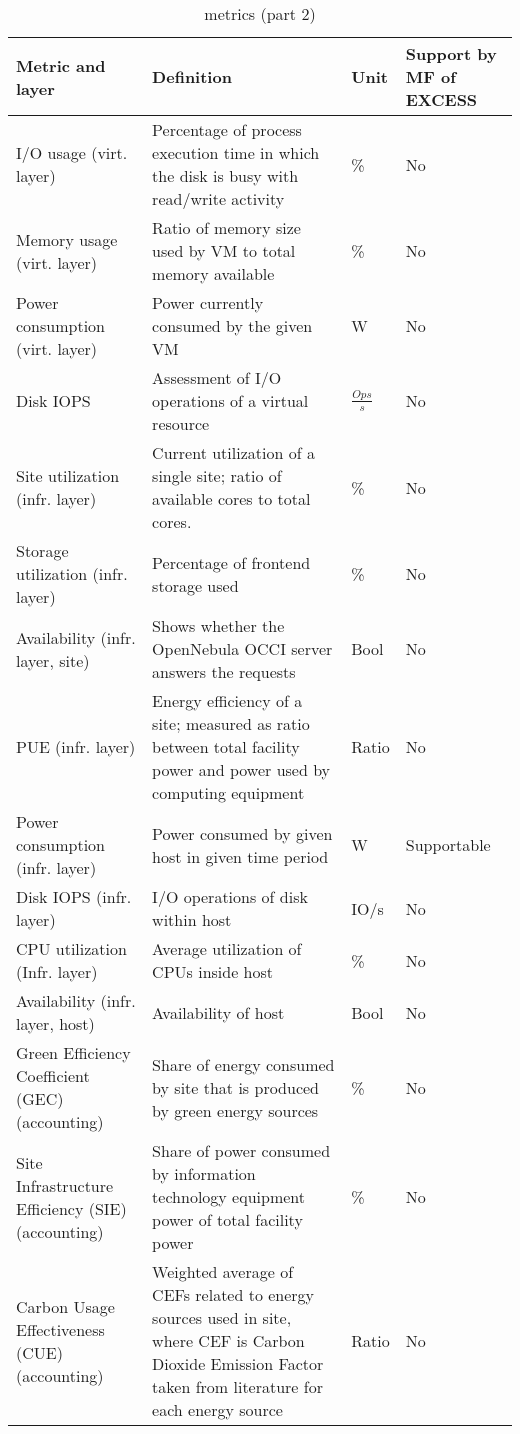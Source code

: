 \documentclass[10pt,letterpaper]{IEEEtran}
\begin{document}
\begin{table}
\caption{\ECO metrics (part 2)}
\label{e2c2}
\small
\begin{center}
\begin{tabular}{|m{1.5cm}|m{4cm}|m{0.5cm}|m{1.3cm}|}
\hline
Metric and layer & Definition & Unit & Support by MF of EXCESS \\ \hline \hline
I/O usage (virt. layer) & Percentage of process execution time in which the disk is busy with read/write activity & \% & No \\ \hline
Memory usage (virt. layer) & Ratio of memory size used by VM to total memory available & \% & No \\ \hline
Power consumption (virt. layer) & Power currently consumed by the given VM & W & No\\ \hline
Disk IOPS & Assessment of I/O operations of a virtual resource
& $\frac{Ops}{s}$ & No\\ \hline
Site utilization (infr. layer) & Current utilization of a single site; ratio of available cores to total cores.
& \% & No \\ \hline
Storage utilization (infr. layer) & Percentage of frontend storage used
& \% & No \\ \hline
Availability (infr. layer, site) & Shows whether the OpenNebula OCCI server answers the requests
& Bool & No\\ \hline
PUE (infr. layer) & Energy efficiency of a site; measured as ratio between
total facility power and power used by computing equipment
& Ratio & No \\ \hline
Power consumption (infr. layer) & Power consumed by given host in given time period & W & Supportable \\ \hline
Disk IOPS (infr. layer) & I/O operations of disk within host & IO/s & No \\ \hline
CPU utilization (Infr. layer) & Average utilization of CPUs inside host
& \% & No \\ \hline
Availability (infr. layer, host) & Availability of host & Bool & No \\ \hline
Green Efficiency Coefficient (GEC) (accounting) & Share of energy consumed by site that
is produced by green energy sources & \% & No \\ \hline
Site Infrastructure Efficiency (SIE) (accounting) & Share of power consumed by information technology
equipment power of total facility power & \% & No \\ \hline
Carbon Usage Effectiveness (CUE) (accounting) & Weighted average of CEFs related to
energy sources used in site, where CEF is Carbon Dioxide Emission Factor taken from literature for
each energy source & Ratio & No \\ \hline
\end{tabular}
\end{center}
\end{table}
\end{document}
